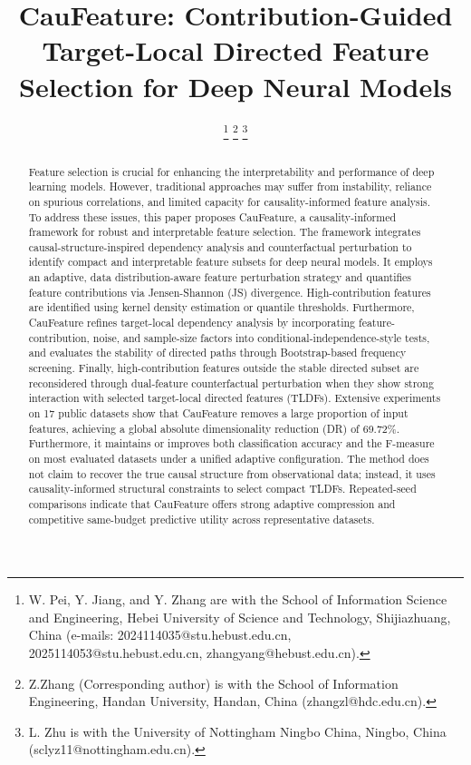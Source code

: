 \documentclass[journal]{IEEEtran}
\begin{document}
\title{CauFeature: Contribution-Guided Target-Local Directed Feature Selection for Deep Neural Models}

\author{
    \thanks{      
        W. Pei, Y. Jiang, and Y. Zhang are with the School of Information Science and Engineering, Hebei University of Science and Technology, Shijiazhuang, China (e-mails: 2024114035@stu.hebust.edu.cn, 2025114053@stu.hebust.edu.cn, zhangyang@hebust.edu.cn).               
    }
    \thanks{Z.Zhang (Corresponding author) is with the School of Information Engineering, Handan University, Handan, China (zhangzl@hdc.edu.cn).}
    \thanks{
        L. Zhu is with the University of Nottingham Ningbo China, Ningbo, China (sclyz11@nottingham.edu.cn). 
    }
}

\maketitle

\begin{abstract}
Feature selection is crucial for enhancing the interpretability and performance of deep learning models. However, traditional approaches may suffer from instability, reliance on spurious correlations, and limited capacity for causality-informed feature analysis. To address these issues, this paper proposes CauFeature, a causality-informed framework for robust and interpretable feature selection. The framework integrates causal-structure-inspired dependency analysis and counterfactual perturbation to identify compact and interpretable feature subsets for deep neural models. It employs an adaptive, data distribution-aware feature perturbation strategy and quantifies feature contributions via Jensen-Shannon (JS) divergence. High-contribution features are identified using kernel density estimation or quantile thresholds. Furthermore, CauFeature refines target-local dependency analysis by incorporating feature-contribution, noise, and sample-size factors into conditional-independence-style tests, and evaluates the stability of directed paths through Bootstrap-based frequency screening. Finally, high-contribution features outside the stable directed subset are reconsidered through dual-feature counterfactual perturbation when they show strong interaction with selected target-local directed features (TLDFs).
Extensive experiments on 17 public datasets show that CauFeature removes a large proportion of input features, achieving a global absolute dimensionality reduction (DR) of 69.72\%. Furthermore, it maintains or improves both classification accuracy and the F-measure on most evaluated datasets under a unified adaptive configuration. The method does not claim to recover the true causal structure from observational data; instead, it uses causality-informed structural constraints to select compact TLDFs. Repeated-seed comparisons indicate that CauFeature offers strong adaptive compression and competitive same-budget predictive utility across representative datasets.
\end{abstract}
\end{document}
